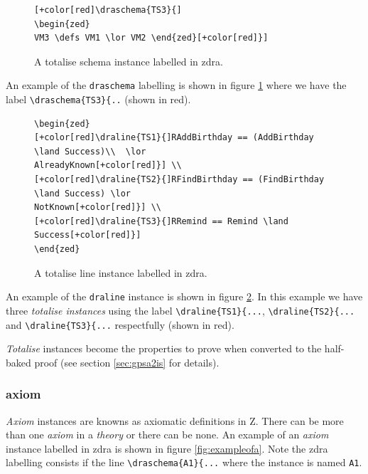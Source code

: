 \begin{figure}[H]
\centering
\begin{footnotesize}
\begin{BVerbatim}[commandchars=+\[\]] [+color[red]\draschema{TS3}{]
\begin{zed}
VM3 \defs VM1 \lor VM2 \end{zed}[+color[red]}]
\end{BVerbatim}
\end{footnotesize}
\caption{\label{fig:exampleofts1} A totalise schema instance labelled in \gls{zdra}.}
\end{figure}

An example of the \verb|draschema| labelling is shown in figure
\ref{fig:exampleofts1} where we have the label \verb|\draschema{TS3}{..| (shown
in red).

\begin{figure}[H]
\centering
\begin{footnotesize}
\begin{BVerbatim}[commandchars=+\[\]]
\begin{zed} 
[+color[red]\draline{TS1}{]RAddBirthday == (AddBirthday \land Success)\\  \lor
AlreadyKnown[+color[red]}] \\
[+color[red]\draline{TS2}{]RFindBirthday == (FindBirthday \land Success) \lor
NotKnown[+color[red]}] \\
[+color[red]\draline{TS3}{]RRemind == Remind \land Success[+color[red]}]
\end{zed}
\end{BVerbatim}
\end{footnotesize}
\caption{\label{fig:exampleofts2} A totalise line instance labelled in \gls{zdra}.}
\end{figure}

An example of the \verb|draline| instance is shown in figure
\ref{fig:exampleofts2}. In this example we have three \emph{totalise instances}
using the label \verb|\draline{TS1}{...|, \verb|\draline{TS2}{...| and
\verb|\draline{TS3}{...| respectfully (shown in red).

\emph{Totalise} instances become the properties to prove when converted to the
half-baked proof (see section \ref{sec:gpsa2is} for details).


\subsubsection{axiom}

\emph{Axiom} instances are knowns as axiomatic definitions in Z. There can be
more than one \emph{axiom} in a \emph{theory} or there can be none. An example
of an \emph{axiom} instance labelled in \gls{zdra} is shown in figure
\ref{fig:exampleofa}. Note the \gls{zdra} labelling consists if the line
\verb|\draschema{A1}{...| where the instance is named \verb|A1|.

